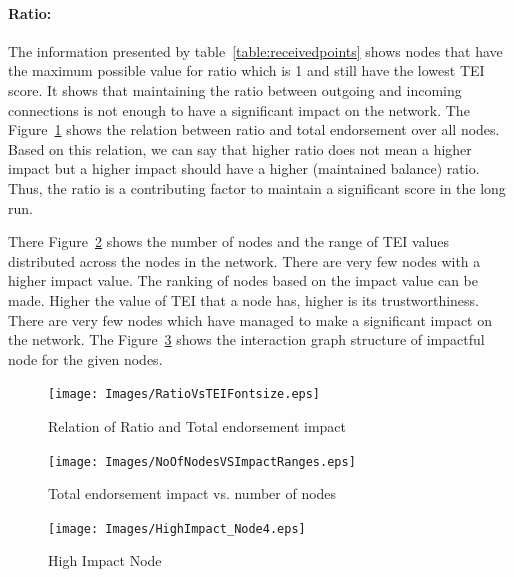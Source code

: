 \paragraph{Ratio:} The information presented by
table~\ref{table:receivedpoints} shows nodes that have the maximum possible
value for ratio which is 1 and still have the lowest \ac{TEI} score. It shows
that maintaining the ratio between outgoing and incoming connections is not
enough to have a significant impact on the network. The
Figure~\ref{fig:ratioimpact} shows the relation between ratio and total
endorsement over all nodes. Based on this relation, we can say that higher
ratio does not mean a higher impact but a higher impact should have a higher
(maintained balance) ratio. Thus, the ratio is a contributing factor to
maintain a significant score in the long run. \par
There Figure~\ref{table:totalimpact} shows the number of nodes and the range of
\ac{TEI} values distributed across the nodes in the network. There are very few
nodes with a higher impact value. The ranking of nodes based on the impact
value can be made. Higher the value of \ac{TEI} that a node has, higher is its
trustworthiness. There are very few nodes which have managed to make a
significant impact on the network. The Figure~\ref{fig:highImpactNode} shows
the interaction graph structure of impactful node for the given nodes. 
\begin{figure}
	\texttt{[image: Images/RatioVsTEIFontsize.eps]}
	\caption{Relation of Ratio and Total endorsement impact}
	\label{fig:ratioimpact}
\end{figure}
\begin{figure}
	\texttt{[image: Images/NoOfNodesVSImpactRanges.eps]}
	\caption{Total endorsement impact vs. number of nodes}
	\label{table:totalimpact}
\end{figure}
\begin{figure}
	\texttt{[image: Images/HighImpact\_Node4.eps]}
	\caption{High Impact Node}
	\label{fig:highImpactNode}
\end{figure}
